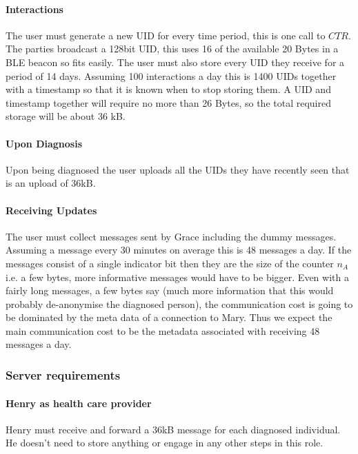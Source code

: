 \documentclass{article}
\begin{document}
\paragraph{Interactions}
The user must generate a new UID for every time period, this is one call to $\mathit{CTR}$. The parties broadcast a 128bit UID, this uses 16 of the available 20 Bytes in a BLE beacon so fits easily. The user must also store every UID they receive for a period of 14 days. Assuming 100 interactions a day this is 1400 UIDs together with a timestamp so that it is known when to stop storing them. A UID and timestamp together will require no more than 26 Bytes, so the total required storage will be about 36 kB.

\paragraph{Upon Diagnosis}
Upon being diagnosed the user uploads all the UIDs they have recently seen that is an upload of 36kB.

\paragraph{Receiving Updates}
The user must collect messages sent by Grace including the dummy messages. Assuming a message every 30 minutes on average this is 48 messages a day. If the messages consist of a single indicator bit then they are the size of the counter $n_A$ i.e. a few bytes, more informative messages would have to be bigger. Even with a fairly long messages, a few bytes say (much more information that this would probably de-anonymise the diagnosed person), the communication cost is going to be dominated by the meta data of a connection to Mary. Thus we expect the main communication cost to be the metadata associated with receiving 48 messages a day.

\subsubsection{Server requirements}

\paragraph{Henry as health care provider}
Henry must receive and forward a 36kB message for each diagnosed individual. He doesn't need to store anything or engage in any other steps in this role.
\end{document}
